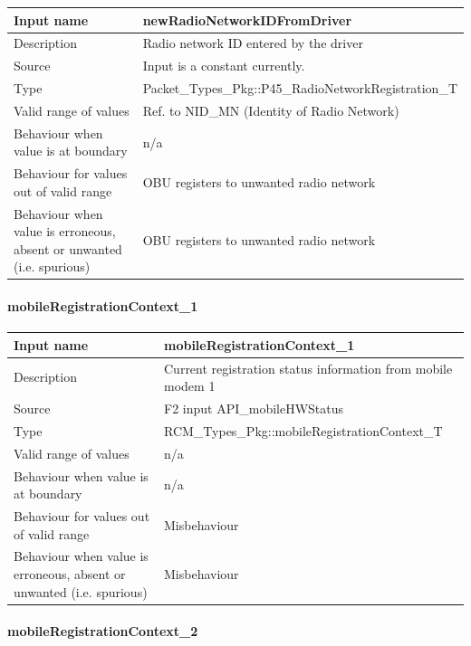 \begin{longtable}{p{}p{}}
	\toprule
	Input name				& newRadioNetworkIDFromDriver \\
	\midrule
	Description				& Radio network ID entered by the driver \\
	\midrule
	Source					& Input is a constant currently. \\ 
	\midrule
	Type					& Packet\_Types\_Pkg::P45\_RadioNetworkRegistration\_T \\
	\midrule
	Valid range of values	& Ref. to NID\_MN (Identity of Radio Network)  \\
	\midrule
	Behaviour when value is at boundary	& n/a \\
	\midrule
	Behaviour for values out of valid range	& OBU registers to unwanted radio network \\
	\midrule
	Behaviour when value is erroneous, absent or unwanted (i.e. spurious) & OBU registers to unwanted radio network  \\
	\bottomrule
\end{longtable}

\paragraph{mobileRegistrationContext\_1}

\begin{longtable}{p{}p{}}
	\toprule
	Input name				& mobileRegistrationContext\_1 \\
	\midrule
	Description				& Current registration status information from mobile modem 1 \\
	\midrule
	Source					& F2 input API\_mobileHWStatus \\ 
	\midrule
	Type					& RCM\_Types\_Pkg::mobileRegistrationContext\_T \\
	\midrule
	Valid range of values	& n/a \\
	\midrule
	Behaviour when value is at boundary	& n/a \\
	\midrule
	Behaviour for values out of valid range	& Misbehaviour \\
	\midrule
	Behaviour when value is erroneous, absent or unwanted (i.e. spurious) & Misbehaviour \\
	\bottomrule
\end{longtable}

\paragraph{mobileRegistrationContext\_2}

